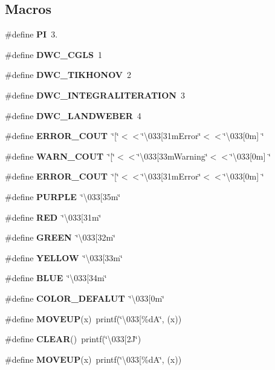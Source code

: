 \subsection*{Macros}
\begin{DoxyCompactItemize}
\item 
\#define \textbf{ PI}~3.
\item 
\#define \textbf{ D\+W\+C\+\_\+\+C\+G\+LS}~1
\item 
\#define \textbf{ D\+W\+C\+\_\+\+T\+I\+K\+H\+O\+N\+OV}~2
\item 
\#define \textbf{ D\+W\+C\+\_\+\+I\+N\+T\+E\+G\+R\+A\+L\+I\+T\+E\+R\+A\+T\+I\+ON}~3
\item 
\#define \textbf{ D\+W\+C\+\_\+\+L\+A\+N\+D\+W\+E\+B\+ER}~4
\item 
\#define \textbf{ E\+R\+R\+O\+R\+\_\+\+C\+O\+UT}~\char`\"{}[\char`\"{}$<$$<$\char`\"{}\textbackslash{}033[31m\+Error\char`\"{}$<$$<$\char`\"{}\textbackslash{}033[0m] \char`\"{}
\item 
\#define \textbf{ W\+A\+R\+N\+\_\+\+C\+O\+UT}~\char`\"{}[\char`\"{}$<$$<$\char`\"{}\textbackslash{}033[33m\+Warning\char`\"{}$<$$<$\char`\"{}\textbackslash{}033[0m] \char`\"{}
\item 
\#define \textbf{ E\+R\+R\+O\+R\+\_\+\+C\+O\+UT}~\char`\"{}[\char`\"{}$<$$<$\char`\"{}\textbackslash{}033[31m\+Error\char`\"{}$<$$<$\char`\"{}\textbackslash{}033[0m] \char`\"{}
\item 
\#define \textbf{ P\+U\+R\+P\+LE}~\char`\"{}\textbackslash{}033[35m\char`\"{}
\item 
\#define \textbf{ R\+ED}~\char`\"{}\textbackslash{}033[31m\char`\"{}
\item 
\#define \textbf{ G\+R\+E\+EN}~\char`\"{}\textbackslash{}033[32m\char`\"{}
\item 
\#define \textbf{ Y\+E\+L\+L\+OW}~\char`\"{}\textbackslash{}033[33m\char`\"{}
\item 
\#define \textbf{ B\+L\+UE}~\char`\"{}\textbackslash{}033[34m\char`\"{}
\item 
\#define \textbf{ C\+O\+L\+O\+R\+\_\+\+D\+E\+F\+A\+L\+UT}~\char`\"{}\textbackslash{}033[0m\char`\"{}
\item 
\#define \textbf{ M\+O\+V\+E\+UP}(x)~printf(\char`\"{}\textbackslash{}033[\%dA\char`\"{}, (x))
\item 
\#define \textbf{ C\+L\+E\+AR}()~printf(\char`\"{}\textbackslash{}033[2\+J\char`\"{})
\item 
\#define \textbf{ M\+O\+V\+E\+UP}(x)~printf(\char`\"{}\textbackslash{}033[\%dA\char`\"{}, (x))

\end{DoxyCompactItemize}
